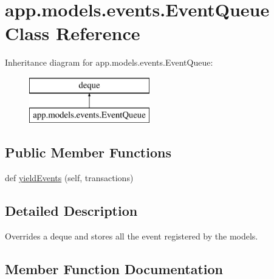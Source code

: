 \hypertarget{classapp_1_1models_1_1events_1_1_event_queue}{}\section{app.\+models.\+events.\+Event\+Queue Class Reference}
\label{classapp_1_1models_1_1events_1_1_event_queue}
Inheritance diagram for app.\+models.\+events.\+Event\+Queue\+:\begin{figure}[H]
\begin{center}
\leavevmode
\includegraphics[height=2.000000cm]{classapp_1_1models_1_1events_1_1_event_queue}
\end{center}
\end{figure}
\subsection*{Public Member Functions}
\begin{DoxyCompactItemize}
\item 
def \hyperlink{classapp_1_1models_1_1events_1_1_event_queue_a6a528b3fc304fb2a5075610034566c37}{yield\+Events} (self, transactions)
\end{DoxyCompactItemize}


\subsection{Detailed Description}
\begin{DoxyVerb}Overrides a deque and stores all the event registered by the models.
\end{DoxyVerb}
 

\subsection{Member Function Documentation}
\mbox{\label{classapp_1_1models_1_1events_1_1_event_queue_a6a528b3fc304fb2a5075610034566c37}} 
